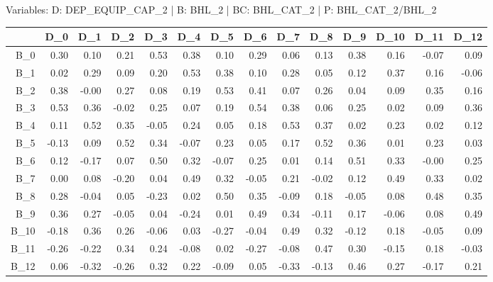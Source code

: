\documentclass[10pt,a4paper]{article}\usepackage[]{graphicx}\usepackage[]{color}
\newcommand{\AaA}{\_}
\begin{document}
\newpage
Variables: D: DEP\AaA EQUIP\AaA CAP\AaA 2  | B: BHL\AaA 2  | BC: BHL\AaA CAT\AaA 2  | P: BHL\AaA CAT\AaA 2/BHL\AaA 2%
\begin{table}[ht]
\centering
\begin{tabular}{rrrrrrrrrrrrrr}
  \hline
 & D\_0 & D\_1 & D\_2 & D\_3 & D\_4 & D\_5 & D\_6 & D\_7 & D\_8 & D\_9 & D\_10 & D\_11 & D\_12 \\ 
  \hline
B\_0 & 0.30 & 0.10 & 0.21 & 0.53 & 0.38 & 0.10 & 0.29 & 0.06 & 0.13 & 0.38 & 0.16 & -0.07 & 0.09 \\ 
  B\_1 & 0.02 & 0.29 & 0.09 & 0.20 & 0.53 & 0.38 & 0.10 & 0.28 & 0.05 & 0.12 & 0.37 & 0.16 & -0.06 \\ 
  B\_2 & 0.38 & -0.00 & 0.27 & 0.08 & 0.19 & 0.53 & 0.41 & 0.07 & 0.26 & 0.04 & 0.09 & 0.35 & 0.16 \\ 
  B\_3 & 0.53 & 0.36 & -0.02 & 0.25 & 0.07 & 0.19 & 0.54 & 0.38 & 0.06 & 0.25 & 0.02 & 0.09 & 0.36 \\ 
  B\_4 & 0.11 & 0.52 & 0.35 & -0.05 & 0.24 & 0.05 & 0.18 & 0.53 & 0.37 & 0.02 & 0.23 & 0.02 & 0.12 \\ 
  B\_5 & -0.13 & 0.09 & 0.52 & 0.34 & -0.07 & 0.23 & 0.05 & 0.17 & 0.52 & 0.36 & 0.01 & 0.23 & 0.03 \\ 
  B\_6 & 0.12 & -0.17 & 0.07 & 0.50 & 0.32 & -0.07 & 0.25 & 0.01 & 0.14 & 0.51 & 0.33 & -0.00 & 0.25 \\ 
  B\_7 & 0.00 & 0.08 & -0.20 & 0.04 & 0.49 & 0.32 & -0.05 & 0.21 & -0.02 & 0.12 & 0.49 & 0.33 & 0.02 \\ 
  B\_8 & 0.28 & -0.04 & 0.05 & -0.23 & 0.02 & 0.50 & 0.35 & -0.09 & 0.18 & -0.05 & 0.08 & 0.48 & 0.35 \\ 
  B\_9 & 0.36 & 0.27 & -0.05 & 0.04 & -0.24 & 0.01 & 0.49 & 0.34 & -0.11 & 0.17 & -0.06 & 0.08 & 0.49 \\ 
  B\_10 & -0.18 & 0.36 & 0.26 & -0.06 & 0.03 & -0.27 & -0.04 & 0.49 & 0.32 & -0.12 & 0.18 & -0.05 & 0.09 \\ 
  B\_11 & -0.26 & -0.22 & 0.34 & 0.24 & -0.08 & 0.02 & -0.27 & -0.08 & 0.47 & 0.30 & -0.15 & 0.18 & -0.03 \\ 
  B\_12 & 0.06 & -0.32 & -0.26 & 0.32 & 0.22 & -0.09 & 0.05 & -0.33 & -0.13 & 0.46 & 0.27 & -0.17 & 0.21 \\ 
   \hline
\end{tabular}
\end{table}
\end{document}
